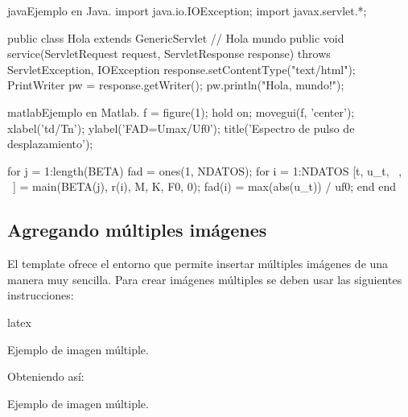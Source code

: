 \begin{sourcecode}[]{java}{Ejemplo en Java.}
import java.io.IOException;
import javax.servlet.*;

public class Hola extends GenericServlet { // Hola mundo
	public void service(ServletRequest request, ServletResponse response)
	throws ServletException, IOException{
		response.setContentType("text/html");
		PrintWriter pw = response.getWriter();
		pw.println("Hola, mundo!");
	}
}
\end{sourcecode}

\begin{sourcecode}{matlab}{Ejemplo en Matlab.}
f = figure(1);
hold on; movegui(f, 'center');
xlabel('td/Tn'); ylabel('FAD=Umax/Uf0');
title('Espectro de pulso de desplazamiento');

for j = 1:length(BETA)
	fad = ones(1, NDATOS); %
	for i = 1:NDATOS
		[t, u_t, ~, ~] = main(BETA(j), r(i), M, K, F0, 0);
		fad(i) = max(abs(u_t)) / uf0;
	end
end
\end{sourcecode}

\subsection{Agregando múltiples imágenes}

El template ofrece el entorno \href{https://latex.ppizarror.com/informe.html#hlp-images}{} que permite insertar múltiples imágenes de una manera muy sencilla. Para crear imágenes múltiples se deben usar las siguientes instrucciones:

\begin{sourcecode}{latex}{}
\begin{images}[\label{imagenmultiple}]{Ejemplo de imagen múltiple.}
	\imagesnewline
\end{images}
\end{sourcecode}

Obteniendo así:

\begin{images}{Ejemplo de imagen múltiple.}
	\imagesnewline
\end{images}

